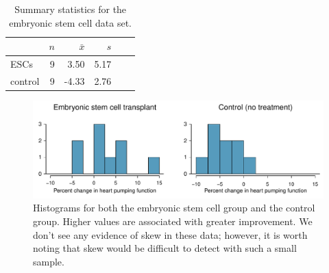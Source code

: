 \textA{\newpage}


\begin{table}[h]
\centering
\begin{tabular}{l rrrrr}
\hline
\hspace{10mm}	& $n$	& $\bar{x}$	& $s$  	 \\
\hline
ESCs		& 9		& 3.50		& 5.17  	\\
control		& 9		& -4.33		& 2.76  	 \\
\hline
\end{tabular}
\caption{Summary statistics for the embryonic stem cell data set.}
\label{summaryStatsForSheepHeartDataWhoReceivedMiceESCs}
\end{table}

\begin{figure}
\centering
\includegraphics[width=\textwidth]{ch_inference_for_means/figures/stemCellTherapyForHearts/stemCellTherapyForHearts}
\caption{Histograms for both the embryonic stem cell group and the control group. Higher values are associated with greater improvement. We don't see any evidence of skew in these data; however, it is worth noting that skew would be difficult to detect with such a small sample.}
\label{stemCellTherapyForHearts}
\end{figure}

